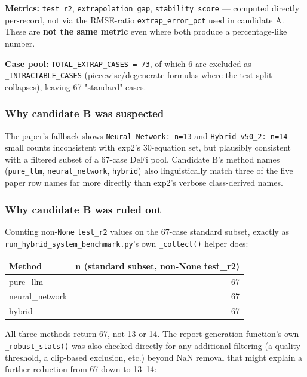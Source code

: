 \documentclass[11pt]{article}
\newcommand{\code}[1]{\texttt{#1}}
\begin{document}
\textbf{Metrics:} \code{test\_r2}, \code{extrapolation\_gap},
\code{stability\_score} --- computed directly per-record, not via the
RMSE-ratio \code{extrap\_error\_pct} used in candidate A. These are
\textbf{not the same metric} even where both produce a percentage-like
number.

\textbf{Case pool:} \code{TOTAL\_EXTRAP\_CASES = 73}, of which 6 are
excluded as \code{\_INTRACTABLE\_CASES} (piecewise/degenerate formulas
where the test split collapses), leaving 67 "standard" cases.

\subsubsection*{Why candidate B was suspected}

The paper's fallback shows \code{Neural Network: n=13} and
\code{Hybrid v50\_2: n=14} --- small counts inconsistent with exp2's 30-equation
set, but plausibly consistent with a filtered subset of a 67-case DeFi
pool. Candidate B's method names (\code{pure\_llm}, \code{neural\_network},
\code{hybrid}) also linguistically match three of the five paper row names
far more directly than exp2's verbose class-derived names.

\subsubsection*{Why candidate B was ruled out}

Counting non-\code{None} \code{test\_r2} values on the 67-case standard
subset, exactly as \code{run\_hybrid\_system\_benchmark.py}'s own
\code{\_collect()} helper does:

\begin{center}
\begin{tabular}{lr}
\toprule
\textbf{Method} & \textbf{n (standard subset, non-None test\_r2)} \\
\midrule
pure\_llm       & 67 \\
neural\_network & 67 \\
hybrid          & 67 \\
\bottomrule
\end{tabular}
\end{center}

All three methods return 67, not 13 or 14. The report-generation function's
own \code{\_robust\_stats()} was also checked directly for any additional
filtering (a quality threshold, a clip-based exclusion, etc.) beyond NaN
removal that might explain a further reduction from 67 down to 13--14:
\end{document}
